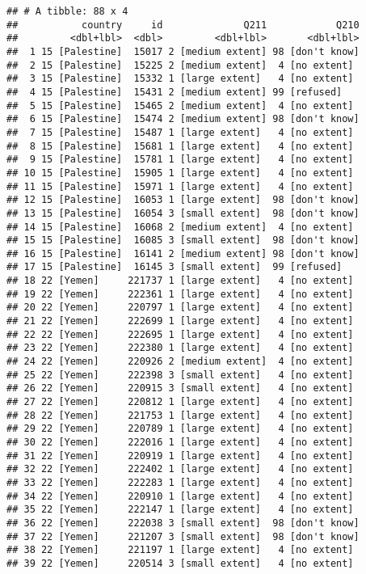 \documentclass[]{article}
\begin{document}
\begin{verbatim}
## # A tibble: 88 x 4
##           country     id              Q211            Q210
##         <dbl+lbl>  <dbl>         <dbl+lbl>       <dbl+lbl>
##  1 15 [Palestine]  15017 2 [medium extent] 98 [don't know]
##  2 15 [Palestine]  15225 2 [medium extent]  4 [no extent] 
##  3 15 [Palestine]  15332 1 [large extent]   4 [no extent] 
##  4 15 [Palestine]  15431 2 [medium extent] 99 [refused]   
##  5 15 [Palestine]  15465 2 [medium extent]  4 [no extent] 
##  6 15 [Palestine]  15474 2 [medium extent] 98 [don't know]
##  7 15 [Palestine]  15487 1 [large extent]   4 [no extent] 
##  8 15 [Palestine]  15681 1 [large extent]   4 [no extent] 
##  9 15 [Palestine]  15781 1 [large extent]   4 [no extent] 
## 10 15 [Palestine]  15905 1 [large extent]   4 [no extent] 
## 11 15 [Palestine]  15971 1 [large extent]   4 [no extent] 
## 12 15 [Palestine]  16053 1 [large extent]  98 [don't know]
## 13 15 [Palestine]  16054 3 [small extent]  98 [don't know]
## 14 15 [Palestine]  16068 2 [medium extent]  4 [no extent] 
## 15 15 [Palestine]  16085 3 [small extent]  98 [don't know]
## 16 15 [Palestine]  16141 2 [medium extent] 98 [don't know]
## 17 15 [Palestine]  16145 3 [small extent]  99 [refused]   
## 18 22 [Yemen]     221737 1 [large extent]   4 [no extent] 
## 19 22 [Yemen]     222361 1 [large extent]   4 [no extent] 
## 20 22 [Yemen]     220797 1 [large extent]   4 [no extent] 
## 21 22 [Yemen]     222699 1 [large extent]   4 [no extent] 
## 22 22 [Yemen]     222695 1 [large extent]   4 [no extent] 
## 23 22 [Yemen]     222380 1 [large extent]   4 [no extent] 
## 24 22 [Yemen]     220926 2 [medium extent]  4 [no extent] 
## 25 22 [Yemen]     222398 3 [small extent]   4 [no extent] 
## 26 22 [Yemen]     220915 3 [small extent]   4 [no extent] 
## 27 22 [Yemen]     220812 1 [large extent]   4 [no extent] 
## 28 22 [Yemen]     221753 1 [large extent]   4 [no extent] 
## 29 22 [Yemen]     220789 1 [large extent]   4 [no extent] 
## 30 22 [Yemen]     222016 1 [large extent]   4 [no extent] 
## 31 22 [Yemen]     220919 1 [large extent]   4 [no extent] 
## 32 22 [Yemen]     222402 1 [large extent]   4 [no extent] 
## 33 22 [Yemen]     222283 1 [large extent]   4 [no extent] 
## 34 22 [Yemen]     220910 1 [large extent]   4 [no extent] 
## 35 22 [Yemen]     222147 1 [large extent]   4 [no extent] 
## 36 22 [Yemen]     222038 3 [small extent]  98 [don't know]
## 37 22 [Yemen]     221207 3 [small extent]  98 [don't know]
## 38 22 [Yemen]     221197 1 [large extent]   4 [no extent] 
## 39 22 [Yemen]     220514 3 [small extent]   4 [no extent] 

\end{verbatim}
\end{document}
